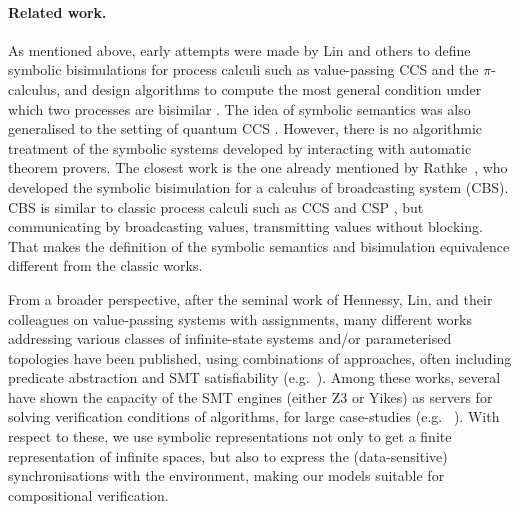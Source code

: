 \documentclass[smallcondensed]{svjour3}
\newcommand{\TODO}[1]{\textcolor{red}{\textbf{[TODO:#1]}}}
\newcommand{\eg}[1][\ ]{e.g.#1}
\begin{document}
\paragraph{Related work.}




As mentioned above, early attempts were made by Lin and others to
define symbolic bisimulations for process calculi such as
value-passing CCS and the $\pi$-calculus, and design algorithms to
compute the most general condition under which two processes are
bisimilar \cite{HennessyLin:TCS95,Linconcur96,APSEC::Lin2001}. The idea of symbolic semantics was also generalised to the setting of quantum CCS \cite{FDY14}. 
However, there is no algorithmic treatment of the symbolic systems developed by
interacting with automatic theorem provers. The closest work is the
one already mentioned by Rathke~\cite{HennessyRathke:TCS98},
who developed the symbolic bisimulation for a
calculus of broadcasting system (CBS). CBS is similar to classic
process calculi such as CCS and CSP \cite{Hoa85}, but communicating by broadcasting
values, %
transmitting values without blocking. That makes the definition of
the symbolic semantics and bisimulation equivalence different from the
classic works.

From a broader perspective, after the seminal work
of Hennessy, Lin, and their colleagues on value-passing systems with
assignments, many
different works addressing various classes of infinite-state systems
and/or parameterised topologies have been published, using
combinations of approaches, often including predicate abstraction and
SMT satisfiability (\eg \cite{DBLP:journals/jsat/AlbertiGPRR12,BruniEtAl-Tiles-Concur2000,CimattiEtAl-NUXMV-CAV2014,ChampionEtAl-Kind2-CAV2016,DBLP:conf/cade/GhilardiNRZ08}). 
Among these works, several have shown the capacity of the SMT engines
(either Z3 or Yikes) as servers for solving verification conditions of
 algorithms, for large case-studies
(\eg
\cite{DBLP:journals/corr/abs-1806-11459,DBLP:journals/corr/CimattiGMT13}).
With
respect to these, we use symbolic representations not only to get a
finite representation of infinite spaces, but also to express the
(data-sensitive) synchronisations with the environment, making our
models suitable for compositional verification.
\end{document}
